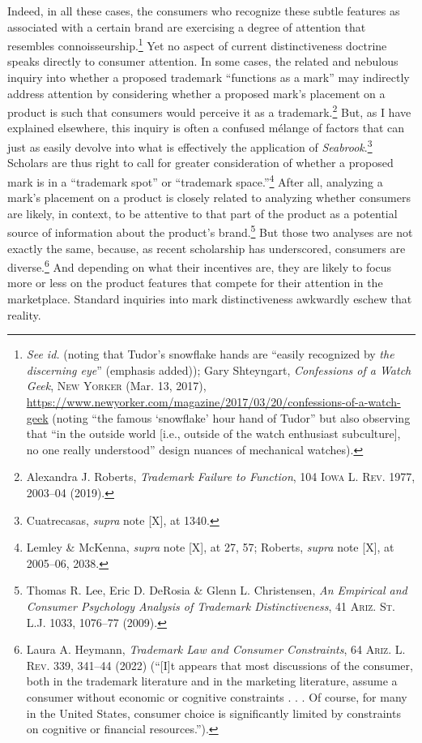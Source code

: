 \documentclass[letterpaper, 11pt, oneside]{article}
\begin{document}
Indeed, in all these cases, the consumers who recognize these subtle features as associated with a certain brand are exercising a degree of attention that resembles connoisseurship.\footnote{\textit{See id.} (noting that Tudor's snowflake hands are ``easily recognized by \textit{the discerning eye}'' (emphasis added)); Gary Shteyngart, \textit{Confessions of a Watch Geek}, \textsc{New Yorker} (Mar. 13, 2017), \url{https://www.newyorker.com/magazine/2017/03/20/confessions-of-a-watch-geek} (noting ``the famous `snowflake' hour hand of Tudor'' but also observing that ``in the outside world [i.e., outside of the watch enthusiast subculture], no one really understood'' design nuances of mechanical watches).} Yet no aspect of current distinctiveness doctrine speaks directly to consumer attention. In some cases, the related and nebulous inquiry into whether a proposed trademark ``functions as a mark'' may indirectly address attention by considering whether a proposed mark's placement on a product is such that consumers would perceive it as a trademark.\footnote{Alexandra J. Roberts, \textit{Trademark Failure to Function}, 104 \textsc{Iowa L. Rev.} 1977, 2003–04 (2019).} But, as I have explained elsewhere, this inquiry is often a confused mélange of factors that can just as easily devolve into what is effectively the application of \textit{Seabrook}.\footnote{Cuatrecasas, \textit{supra} note [X], at 1340.} Scholars are thus right to call for greater consideration of whether a proposed mark is in a ``trademark spot'' or ``trademark space.''\footnote{Lemley \& McKenna, \textit{supra} note [X], at 27, 57; Roberts, \textit{supra} note [X], at 2005–06, 2038.} After all, analyzing a mark's placement on a product is closely related to analyzing whether consumers are likely, in context, to be attentive to that part of the product as a potential source of information about the product's brand.\footnote{Thomas R. Lee, Eric D. DeRosia \& Glenn L. Christensen, \textit{An Empirical and Consumer Psychology Analysis of Trademark Distinctiveness}, 41 \textsc{Ariz. St. L.J.} 1033, 1076–77 (2009).} But those two analyses are not exactly the same, because, as recent scholarship has underscored, consumers are diverse.\footnote{Laura A. Heymann, \textit{Trademark Law and Consumer Constraints}, 64 \textsc{Ariz. L. Rev.} 339, 341–44 (2022) (``[I]t appears that most discussions of the consumer, both in the trademark literature and in the marketing literature, assume a consumer without economic or cognitive constraints . . .  Of course, for many in the United States, consumer choice is significantly limited by constraints on cognitive or financial resources.'').} And depending on what their incentives are, they are likely to focus more or less on the product features that compete for their attention in the marketplace. Standard inquiries into mark distinctiveness awkwardly eschew that reality.
\end{document}
